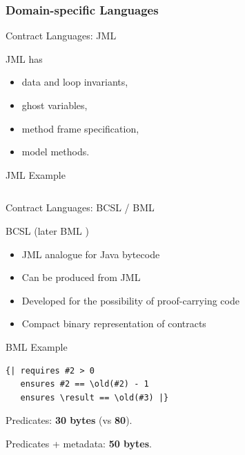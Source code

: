 \documentclass[12pt]{beamer}
\begin{document}
\subsubsection{Domain-specific Languages}
\label{sec:runver-dbc-dsl}

\begin{frame}[fragile]{Contract Languages: \small JML}

  JML \parencite{jml} has

  \begin{itemize}
    \item data and loop invariants,
    \item ghost variables,
    \item method frame specification,
    \item model methods.
  \end{itemize}
\end{frame}

\begin{frame}{JML Example}
  \inputminted[fontsize=\footnotesize]{java}{jmlstack.java}
\end{frame}

\begin{frame}{Contract Languages: \small BCSL / BML}

  BCSL \parencite{bcsl} (later BML \parencite{bml})

  \begin{itemize}
    \item JML analogue for Java bytecode
    \item Can be produced from JML
    \item Developed for the possibility of proof-carrying code
    \item Compact binary representation of contracts
  \end{itemize}
\end{frame}

\begin{frame}[fragile]{BML Example}
  \begin{verbatim}
{| requires #2 > 0
   ensures #2 == \old(#2) - 1
   ensures \result == \old(#3) |}
  \end{verbatim}

  \vspace{0.25cm}

  Predicates: \textbf{30 bytes} (vs \textbf{80}).

  \vspace{0.25cm}

  Predicates + metadata: \textbf{50 bytes}.
\end{frame}
\end{document}
